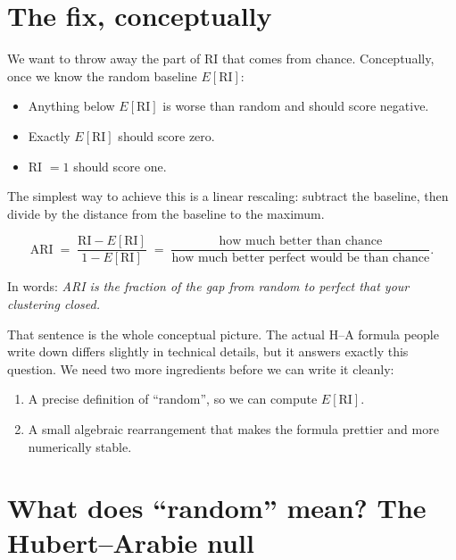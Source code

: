 \documentclass[11pt]{article}
\begin{document}
\section{The fix, conceptually}

We want to throw away the part of RI that comes from chance. Conceptually,
once we know the random baseline $E[\text{RI}]$:

\begin{itemize}\setlength\itemsep{1pt}
  \item Anything below $E[\text{RI}]$ is worse than random and should
        score negative.
  \item Exactly $E[\text{RI}]$ should score zero.
  \item RI $= 1$ should score one.
\end{itemize}

The simplest way to achieve this is a linear rescaling: subtract the
baseline, then divide by the distance from the baseline to the maximum.

\begin{keybox}[title={The conceptual ARI}]
\[
  \text{ARI} \;=\; \frac{\text{RI} - E[\text{RI}]}{1 - E[\text{RI}]}
  \;=\; \frac{\text{how much better than chance}}{\text{how much better
  perfect would be than chance}}.
\]
\end{keybox}

In words: \emph{ARI is the fraction of the gap from random to perfect
that your clustering closed.}

That sentence is the whole conceptual picture. The actual H--A formula
people write down differs slightly in technical details, but it answers
exactly this question. We need two more ingredients before we can write
it cleanly:

\begin{enumerate}\setlength\itemsep{1pt}
  \item A precise definition of ``random'', so we can compute
        $E[\text{RI}]$.
  \item A small algebraic rearrangement that makes the formula prettier
        and more numerically stable.
\end{enumerate}

\section{What does ``random'' mean? The Hubert--Arabie null}
\label{sec:null}
\end{document}
